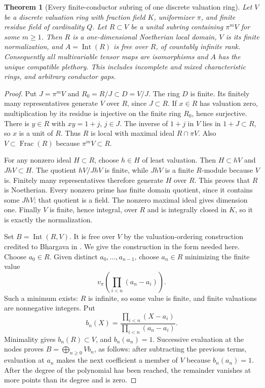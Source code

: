 \documentclass[11pt,a4paper]{article}
\newtheorem{theorem}{Theorem}[section]
\theoremstyle{definition}
\begin{document}
\begin{theorem}[Every finite-conductor subring of one discrete valuation ring]\label{result-29}
Let $V$ be a discrete valuation ring with fraction field $K$,
uniformizer $\pi$, and finite residue field of cardinality $Q$.
Let $R\subset V$ be a unital subring containing $\pi^mV$ for some
$m\ge1$. Then $R$ is a one-dimensional Noetherian local domain,
$V$ is its finite normalization, and
$A=\operatorname{Int}(R)$ is free over $R$, of countably infinite
rank. Consequently
all multivariable tensor maps are isomorphisms and $A$ has the
unique compatible plethory. This includes incomplete and mixed
characteristic rings, and arbitrary conductor gaps.
\end{theorem}
\begin{proof}
Put $J=\pi^mV$ and $R_0=R/J\subset D=V/J$. The ring $D$ is finite.
Its finitely many representatives generate $V$ over $R$, since
$J\subset R$. If $x\in R$ has valuation zero, multiplication by
its residue is injective on the finite ring $R_0$, hence surjective.
There is $y\in R$ with $xy=1+j$, $j\in J$. The inverse of $1+j$
in $V$ lies in $1+J\subset R$, so $x$ is a unit of $R$.
Thus $R$ is local with maximal ideal $R\cap\pi V$.
Also $V\subset\operatorname{Frac}(R)$ because $\pi^mV\subset R$.

For any nonzero ideal $H\subset R$, choose $h\in H$ of least
valuation. Then $H\subset hV$ and $JhV\subset H$.
The quotient $hV/JhV$ is finite, while $JhV$ is a finite $R$-module
because $V$ is. Finitely many representatives therefore generate
$H$ over $R$. This proves that $R$ is Noetherian. Every nonzero
prime has finite domain quotient, since it contains some $JhV$;
that quotient is a field. The nonzero maximal ideal gives dimension
one. Finally $V$ is finite, hence integral, over $R$ and is
integrally closed in $K$, so it is exactly the normalization.

Set $B=\operatorname{Int}(R,V)$. It is free over $V$ by the
valuation-ordering construction credited to Bhargava in
\cite[Definition~4 and Proposition~11, author version pp.~7--8]{Chabert2014RegularBases}.
We give the construction in the form needed here.
Choose $a_0\in R$. Given distinct
$a_0,\ldots,a_{n-1}$, choose $a_n\in R$ minimizing the finite value
\[
 v_\pi\left(\prod_{i<n}(a_n-a_i)\right).
\]
Such a minimum exists: $R$ is infinite, so some value is finite,
and finite valuations are nonnegative integers. Put
\[
 b_n(X)=\frac{\prod_{i<n}(X-a_i)}{\prod_{i<n}(a_n-a_i)}.
\]
Minimality gives $b_n(R)\subset V$, and $b_n(a_n)=1$.
Successive evaluation at the nodes proves
$B=\bigoplus_{n\ge0}Vb_n$, as follows: after subtracting the previous terms, evaluation at
$a_n$ makes the next coefficient a member of $V$ because $b_n(a_n)=1$.
After the degree of the polynomial has been reached, the remainder
vanishes at more points than its degree and is zero.


\end{proof}
\end{document}
